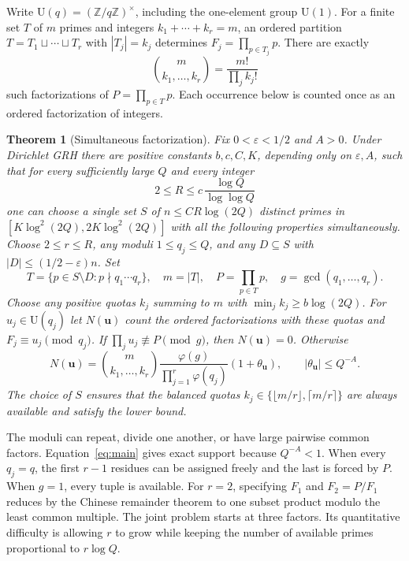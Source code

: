 \documentclass[11pt]{article}
\newtheorem{theorem}{Theorem}[section]
\newcommand{\U}{\mathrm U}
\newcommand{\e}{\varepsilon}
\newcommand{\ph}{\varphi}
\newcommand{\Z}{\mathbb Z}
\begin{document}
Write $\U(q)=(\Z/q\Z)^\times$, including the one-element group $\U(1)$. For a finite set $T$ of $m$ primes and integers $k_1+\cdots+k_r=m$, an ordered partition $T=T_1\sqcup\cdots\sqcup T_r$ with $|T_j|=k_j$ determines $F_j=\prod_{p\in T_j}p$. There are exactly
\[
   {m\choose k_1,\ldots,k_r}=\frac{m!}{\prod_j k_j!}
\]
such factorizations of $P=\prod_{p\in T}p$. Each occurrence below is counted once as an ordered factorization of integers.

\begin{theorem}[Simultaneous factorization]\label{thm:main}
Fix $0<\e<1/2$ and $A>0$. Under Dirichlet GRH there are positive constants $b,c,C,K$, depending only on $\e,A$, such that for every sufficiently large $Q$ and every integer
\[
 2\le R\le c\,\frac{\log Q}{\log\log Q}
\]
one can choose a single set $S$ of $n\le C R\log(2Q)$ distinct primes in
$[K\log^2(2Q),2K\log^2(2Q)]$ with all the following properties simultaneously.
Choose $2\le r\le R$, any moduli $1\le q_j\le Q$, and any $D\subseteq S$ with $|D|\le(1/2-\e)n$. Set
\[
 T=\{p\in S\setminus D:p\nmid q_1\cdots q_r\},\quad m=|T|,
 \quad P=\prod_{p\in T}p,\quad g=\gcd(q_1,\ldots,q_r).
\]
Choose any positive quotas $k_j$ summing to $m$ with $\min_j k_j\ge b\log(2Q)$.
For $u_j\in\U(q_j)$ let $N(\mathbf u)$ count the ordered factorizations with these quotas and $F_j\equiv u_j\pmod{q_j}$. If $\prod_j u_j\not\equiv P\pmod g$, then $N(\mathbf u)=0$. Otherwise
\begin{equation}\label{eq:main}
 N(\mathbf u)={m\choose k_1,\ldots,k_r}
   \frac{\ph(g)}{\prod_{j=1}^r\ph(q_j)}(1+\theta_{\mathbf u}),
 \qquad |\theta_{\mathbf u}|\le Q^{-A}.
\end{equation}
The choice of $S$ ensures that the balanced quotas $k_j\in\{\lfloor m/r\rfloor,\lceil m/r\rceil\}$ are always available and satisfy the lower bound.
\end{theorem}

The moduli can repeat, divide one another, or have large pairwise common factors. Equation~\eqref{eq:main} gives exact support because $Q^{-A}<1$. When every $q_j=q$, the first $r-1$ residues can be assigned freely and the last is forced by $P$. When $g=1$, every tuple is available. For $r=2$, specifying $F_1$ and $F_2=P/F_1$ reduces by the Chinese remainder theorem to one subset product modulo the least common multiple. The joint problem starts at three factors. Its quantitative difficulty is allowing $r$ to grow while keeping the number of available primes proportional to $r\log Q$.
\end{document}
